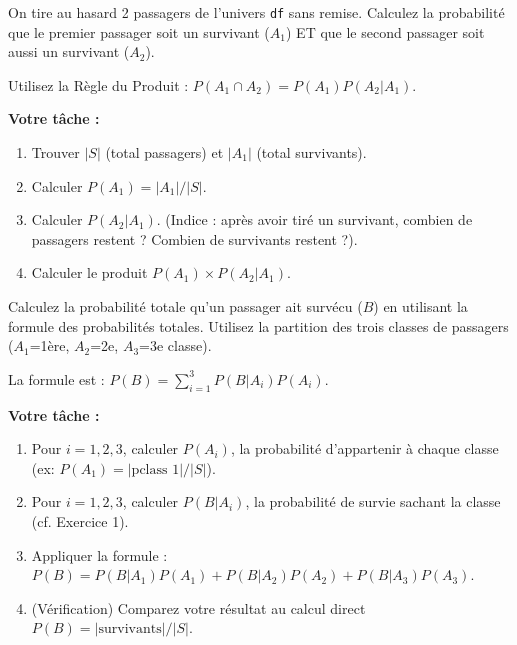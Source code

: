 \begin{exercicebox}
On tire au hasard 2 passagers de l'univers \texttt{df} sans remise. Calculez la probabilité que le premier passager soit un survivant ($A_1$) ET que le second passager soit aussi un survivant ($A_2$).

Utilisez la Règle du Produit : $P(A_1 \cap A_2) = P(A_1)P(A_2|A_1)$.

\textbf{Votre tâche :}
\begin{enumerate}
    \item Trouver $|S|$ (total passagers) et $|A_1|$ (total survivants).
    \item Calculer $P(A_1) = |A_1| / |S|$.
    \item Calculer $P(A_2|A_1)$. (Indice : après avoir tiré un survivant, combien de passagers restent ? Combien de survivants restent ?).
    \item Calculer le produit $P(A_1) \times P(A_2|A_1)$.
\end{enumerate}
\end{exercicebox}

\begin{exercicebox}
Calculez la probabilité totale qu'un passager ait survécu ($B$) en utilisant la formule des probabilités totales. Utilisez la partition des trois classes de passagers ($A_1$=1ère, $A_2$=2e, $A_3$=3e classe).

La formule est : $P(B) = \sum_{i=1}^{3} P(B|A_i)P(A_i)$.

\textbf{Votre tâche :}
\begin{enumerate}
    \item Pour $i=1, 2, 3$, calculer $P(A_i)$, la probabilité d'appartenir à chaque classe (ex: $P(A_1) = |\text{pclass 1}| / |S|$).
    \item Pour $i=1, 2, 3$, calculer $P(B|A_i)$, la probabilité de survie sachant la classe (cf. Exercice 1).
    \item Appliquer la formule : $P(B) = P(B|A_1)P(A_1) + P(B|A_2)P(A_2) + P(B|A_3)P(A_3)$.
    \item (Vérification) Comparez votre résultat au calcul direct $P(B) = |\text{survivants}| / |S|$.
\end{enumerate}
\end{exercicebox}

